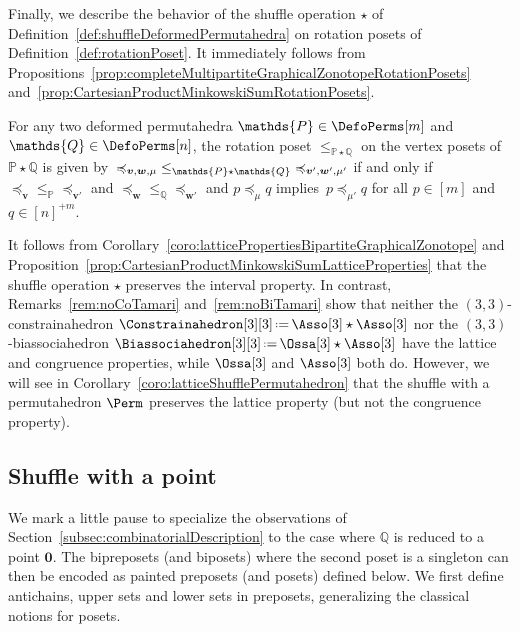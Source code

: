 \documentclass[AHL,Unicode,longabstracts,published]{cedram}
\renewcommand{\b}[1]{\boldsymbol{#1}}
\newcommand{\eqdef}{\mbox{\,\raisebox{0.2ex}{\scriptsize\ensuremath{\mathrm:}}\ensuremath{=}\,}}
\newcommand{\shuffleDP}{\star} %
\newcommand{\polytope}[1]{\mathds{#1}}
\begin{document}
Finally, we describe the behavior of the shuffle operation $\shuffleDP$ of Definition~\ref{def:shuffleDeformedPermutahedra} on rotation posets of Definition~\ref{def:rotationPoset}. It immediately follows from Propositions~\ref{prop:completeMultipartiteGraphicalZonotopeRotationPosets} and~\ref{prop:CartesianProductMinkowskiSumRotationPosets}.

\begin{prop}\label{prop:shuffleRotationPosets}
For any two deformed permutahedra $\polytope{P} \in \DefoPerms[m]$ and ${\polytope{Q} \in \DefoPerms[n]}$, the rotation poset $\le_{\polytope{P} \shuffleDP \polytope{Q}}$ on the vertex posets of $\polytope{P} \shuffleDP \polytope{Q}$ is given by~${\preccurlyeq_{\b{v}, \b{w}, \mu}} \linebreak\le_{\polytope{P} \shuffleDP \polytope{Q}} {\preccurlyeq_{\b{v}', \b{w}', \mu'}}$ if and only if ${\preccurlyeq_{\b{v}}} \le_{\polytope{P}} {\preccurlyeq_{\b{v}'}}$ and ${\preccurlyeq_{\b{w}}} \le_{\polytope{Q}} {\preccurlyeq_{\b{w}'}}$ and $p \preccurlyeq_\mu q$ implies~$p \preccurlyeq_{\mu'} q$ for all $p \in [m]$ and $q \in [n]^{+m}$.
\end{prop}

\begin{rema}\label{rem:latticeShuffle}
It follows from Corollary~\ref{coro:latticePropertiesBipartiteGraphicalZonotope} and Proposition~\ref{prop:CartesianProductMinkowskiSumLatticeProperties} that the shuffle operation $\shuffleDP$ preserves the interval property. In contrast, Remarks~\ref{rem:noCoTamari} and~\ref{rem:noBiTamari} show that neither the \mbox{$(3,3)$-constrainahe}\-dron ${\Constrainahedron[3][3] \eqdef \Asso[3] \shuffleDP \Asso[3]}$ nor the $(3,3)$-biassociahedron ${\Biassociahedron[3][3] \eqdef \Ossa[3] \shuffleDP \Asso[3]}$ have the lattice and congruence properties, while $\Ossa[3]$ and $\Asso[3]$ both do. However, we will see in Corollary~\ref{coro:latticeShufflePermutahedron} that the shuffle with a permutahedron $\Perm$ preserves the lattice property (but not the congruence property).
\end{rema}



\subsection{Shuffle with a point}\label{subsec:shufflePoint}

We mark a little pause to specialize the observations of Section~\ref{subsec:combinatorialDescription} to the case where $\polytope{Q}$ is reduced to a point $\b{0}$. The bipreposets (and biposets) where the second poset is a singleton can then be encoded as painted preposets (and posets) defined below. We first define antichains, upper sets and lower sets in preposets, generalizing the classical notions for posets.
\end{document}
